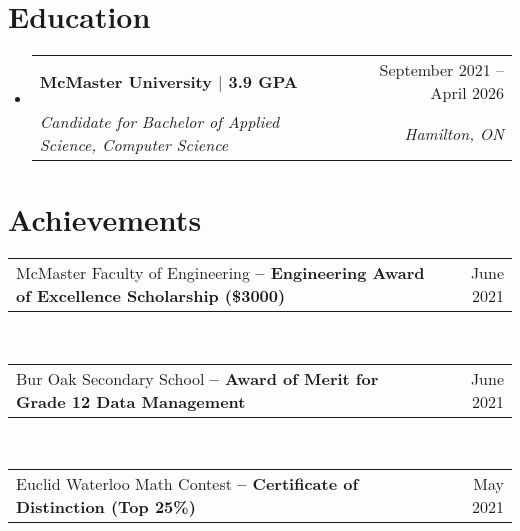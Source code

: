 \documentclass[letterpaper,11pt]{article}
\makeatletter
\newcommand{\resumeSubheading}[4]{
  \vspace{-2pt}\item
    \begin{tabular*}{0.97\textwidth}[t]{l@{\extracolsep{\fill}}r}
      \textbf{#1} & #2 \\
      \textit{\small#3} & \textit{\small #4} \\
    \end{tabular*}\vspace{-7pt}
}
\newcommand{\resumeDatedList}[2]{
    \vspace{-2pt}\item
    \begin{tabular*}{0.97\textwidth}[t]{l@{\extracolsep{\fill}}r}
        #1 & #2 \\
    \end{tabular*}
}
\newcommand{\resumeSubHeadingListStart}{\begin{itemize}[leftmargin=0.15in, label={}]}
\newcommand{\resumeSubHeadingListEnd}{\end{itemize}}
\newcommand{\resumeListStart}{\begin{itemize}[itemindent=-0.33in,leftmargin=0.48in, label={}]}
\newcommand{\resumeListEnd}{\end{itemize}}
\makeatother
\begin{document}
\section{Education}
\resumeSubHeadingListStart
\resumeSubheading
{McMaster University $|$ 3.9 GPA}{September 2021 -- April 2026}
{Candidate for Bachelor of Applied Science, Computer Science}{Hamilton, ON}
\resumeSubHeadingListEnd


%
\section{Achievements}
\resumeListStart\small{
	\resumeDatedList{McMaster Faculty of Engineering \textbf{-- Engineering Award of Excellence Scholarship (\$3000)}}{June 2021} \\
	\resumeDatedList{Bur Oak Secondary School \textbf{-- Award of Merit for Grade 12 Data Management}}{June 2021} \\
	\resumeDatedList{Euclid Waterloo Math Contest \textbf{-- Certificate of Distinction (Top 25\%)}}{May 2021} \\
} \resumeListEnd

\end{document}
